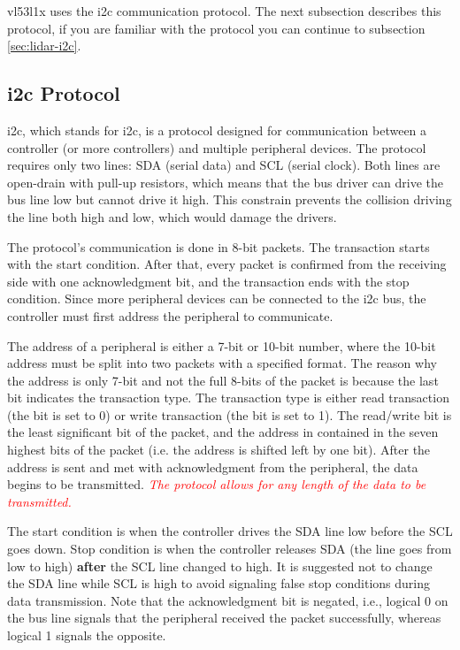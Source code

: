 \documentclass[
  digital,     %
  oneside,     %
  nosansbold,  %
  nocolorbold, %
  lof,         %
  lot,         %
]{fithesis4}
\newcommand{\TODO}[1]{\textcolor{red}{\textit{#1}}}
\begin{document}
{{{\gls{vl53l1x} uses the \acrshort{i2c} communication protocol. The next subsection describes this protocol, if you are familiar with the protocol you can continue to subsection \ref{sec:lidar-i2c}.

\subsection[ Inter-Integrated Circuit Protocol ]{ \acrlong{i2c} Protocol } \label{sec:i2c}
\acrshort{i2c}, which stands for \acrlong{i2c}, is a protocol designed for communication between a controller (or more controllers) and multiple peripheral devices. The protocol requires only two lines: SDA (serial data) and SCL (serial clock). Both lines are open-drain with pull-up resistors, which means that the bus driver can drive the bus line low but cannot drive it high. This constrain prevents the collision  driving the line both high and low, which would damage the drivers.

The protocol's communication is done in 8-bit packets. The transaction starts with the start condition. After that, every packet is confirmed from the receiving side with one acknowledgment bit, and the transaction ends with the stop condition. Since more peripheral devices can be connected to the \acrshort{i2c} bus, the controller must first address the peripheral to communicate.

The address of a peripheral is either a 7-bit or 10-bit number, where the 10-bit address must be split into two packets with a specified format. The reason why the address is only 7-bit and not the full 8-bits of the packet is because the last bit indicates the transaction type. The transaction type is either read transaction (the bit is set to 0) or write transaction (the bit is set to 1). The read/write bit is the least significant bit of the packet, and the address in contained in the seven highest bits of the packet (i.e. the address is shifted left by one bit). After the address is sent and met with acknowledgment from the peripheral, the data begins to be transmitted. \TODO{The protocol allows for any length of the data to be transmitted.}

The start condition is when the controller drives the SDA line low before the SCL goes down. Stop condition is when the controller releases SDA (the line goes from low to high) \textbf{after} the SCL line changed to high. It is suggested not to change the SDA line while SCL is high to avoid signaling false stop conditions during data transmission. Note that the acknowledgment bit is negated, i.e., logical 0 on the bus line signals that the peripheral received the packet successfully, whereas logical 1 signals the opposite.

}}}
\end{document}

